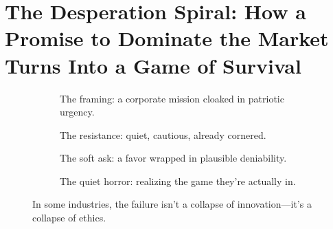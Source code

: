 \section{The Desperation Spiral: How a Promise to Dominate the Market Turns Into a Game of Survival}

\begin{figure}[H]
\centering

\begin{subfigure}[t]{0.45\textwidth}
\centering
{}
\caption*{The framing: a corporate mission cloaked in patriotic urgency.}
\end{subfigure}
\hfill
\begin{subfigure}[t]{0.45\textwidth}
\centering
{}
\caption*{The resistance: quiet, cautious, already cornered.}
\end{subfigure}

\vspace{1em}

\begin{subfigure}[t]{0.45\textwidth}
\centering
{}
\caption*{The soft ask: a favor wrapped in plausible deniability.}
\end{subfigure}
\hfill
\begin{subfigure}[t]{0.45\textwidth}
\centering
{}
\caption*{The quiet horror: realizing the game they’re actually in.}
\end{subfigure}

\caption*{In some industries, the failure isn’t a collapse of innovation—it’s a collapse of ethics.}
\end{figure}

